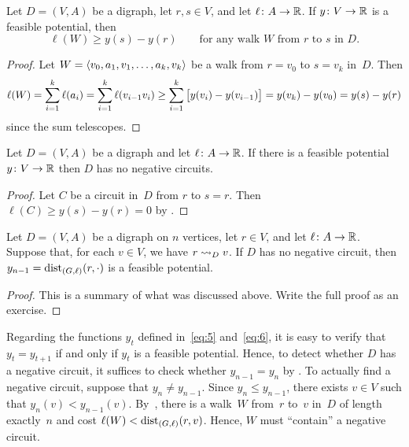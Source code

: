 \documentclass[10pt,reqno]{amsart}
\begin{document}
\begin{theorem}
  \label{thm:1}
  Let \(D = (V,A)\) be a digraph, let \(r,s \in V\), and let
  \(\ell \colon A \to \Reals\).  If \(y \colon V \to \Reals\) is a
  feasible potential, then
  \begin{equation}
    \label{eq:7}
    \ell(W) \geq y(s) - y(r)
    \qquad
    \text{for any walk~\(W\) from~\(r\) to~\(s\) in~\(D\)}.
  \end{equation}
\end{theorem}
\begin{proof}
  Let \(W = \seq{v_0,a_1,v_1,\dotsc,a_k,v_k}\) be a walk from
  \(r = v_0\) to \(s = v_k\) in~\(D\).  Then
  \begin{equation*}
    \ell(W)
    =
    \sum_{i=1}^k \ell(a_i)
    =
    \sum_{i=1}^k \ell(v_{i-1}v_i)
    \geq
    \sum_{i=1}^k \sqbrac[\big]{y(v_i)-y(v_{i-1})}
    =
    y(v_k) - y(v_0)
    =
    y(s) - y(r)
  \end{equation*}
  since the sum telescopes.
\end{proof}

\begin{corollary}
  Let \(D = (V,A)\) be a digraph and let \(\ell \colon A \to \Reals\).
  If there is a feasible potential \(y \colon V \to \Reals\) then
  \(D\) has no negative circuits.
\end{corollary}
\begin{proof}
  Let \(C\) be a circuit in~\(D\) from \(r\) to \(s = r\).  Then
  \(\ell(C) \geq y(s) - y(r) = 0\) by .
\end{proof}

\begin{corollary}
  \label{cor:1}
  Let \(D = (V,A)\) be a digraph on \(n\) vertices, let \(r \in V\),
  and let \(\ell \colon A \to \Reals\).  Suppose that, for each
  \(v \in V\), we have \(r \reaches_D v\).  If \(D\) has no negative
  circuit, then \(y_{n-1} = \dist_{(G,\ell)}(r,\cdot)\) is a feasible
  potential.
\end{corollary}
\begin{proof}
  This is a summary of what was discussed above.  Write the full proof
  as an exercise.
\end{proof}

Regarding the functions \(y_t\) defined in~\eqref{eq:5}
and~\eqref{eq:6}, it is easy to verify that \(y_{t} = y_{t+1}\) if and
only if \(y_t\) is a feasible potential.  Hence, to detect whether
\(D\) has a negative circuit, it suffices to check whether
\(y_{n-1} = y_n\) by .  To actually find a negative
circuit, suppose that \(y_n \neq y_{n-1}\).  Since
\(y_n \leq y_{n-1}\), there exists \(v \in V\) such that
\(y_n(v) < y_{n-1}(v)\).  By~, there is a walk~\(W\)
from~\(r\) to~\(v\) in~\(D\) of length exactly~\(n\) and cost
\(\ell(W) < \dist_{(G,\ell)}(r,v)\).  Hence, \(W\) must ``contain'' a
negative circuit.

\nocite{CookCPS98a,Schrijver03a}

\begingroup
\printbibliography
\endgroup
\end{document}
